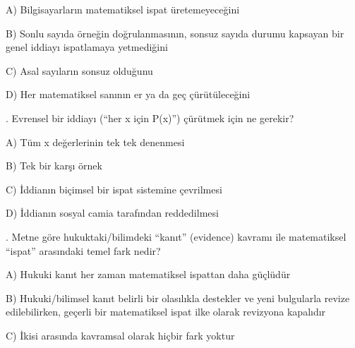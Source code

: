 \par\noindent\hspace*{1.6em}A) Bilgisayarların matematiksel ispat üretemeyeceğini

\par\noindent\hspace*{1.6em}B) Sonlu sayıda örneğin doğrulanmasının, sonsuz sayıda durumu kapsayan bir genel iddiayı ispatlamaya yetmediğini

\par\noindent\hspace*{1.6em}C) Asal sayıların sonsuz olduğunu

\par\noindent\hspace*{1.6em}D) Her matematiksel sanının er ya da geç çürütüleceğini

\par\smallskip{}. Evrensel bir iddiayı (“her x için P(x)”) çürütmek için ne gerekir?

\par\noindent\hspace*{1.6em}A) Tüm x değerlerinin tek tek denenmesi

\par\noindent\hspace*{1.6em}B) Tek bir karşı örnek

\par\noindent\hspace*{1.6em}C) İddianın biçimsel bir ispat sistemine çevrilmesi

\par\noindent\hspace*{1.6em}D) İddianın sosyal camia tarafından reddedilmesi

\par\smallskip{}. Metne göre hukuktaki/bilimdeki “kanıt” (evidence) kavramı ile matematiksel “ispat” arasındaki temel fark nedir?

\par\noindent\hspace*{1.6em}A) Hukuki kanıt her zaman matematiksel ispattan daha güçlüdür

\par\noindent\hspace*{1.6em}B) Hukuki/bilimsel kanıt belirli bir olasılıkla destekler ve yeni bulgularla revize edilebilirken, geçerli bir matematiksel ispat ilke olarak revizyona kapalıdır

\par\noindent\hspace*{1.6em}C) İkisi arasında kavramsal olarak hiçbir fark yoktur

